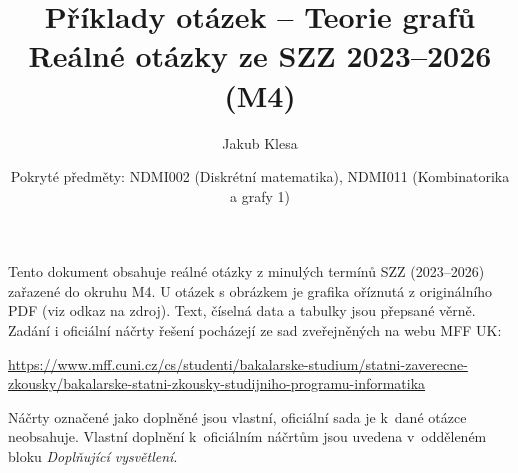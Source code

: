 \documentclass[11pt,a4paper]{article}
\title{Příklady otázek -- Teorie grafů\\[0.3em]\large Reálné otázky ze SZZ 2023--2026 (M4)}
\author{Jakub Klesa}
\date{Pokryté předměty: NDMI002 (Diskrétní matematika), NDMI011 (Kombinatorika a grafy 1)}
\begin{document}
\maketitle
\tableofcontents
\bigskip

\begin{poznamka}
Tento dokument obsahuje reálné otázky z minulých termínů SZZ (2023--2026) zařazené do
okruhu M4. U otázek s obrázkem je grafika oříznutá z originálního PDF (viz odkaz na
zdroj). Text, číselná data a tabulky jsou přepsané věrně.
Zadání i oficiální náčrty řešení pocházejí ze sad zveřejněných na webu MFF UK:\par
{\raggedright\url{https://www.mff.cuni.cz/cs/studenti/bakalarske-studium/statni-zaverecne-zkousky/bakalarske-statni-zkousky-studijniho-programu-informatika}\par}
Náčrty označené jako doplněné jsou vlastní, oficiální sada je k~dané otázce neobsahuje.
Vlastní doplnění k~oficiálním náčrtům jsou uvedena v~odděleném bloku \emph{Doplňující vysvětlení}.
\end{poznamka}
\bigskip






\end{document}
